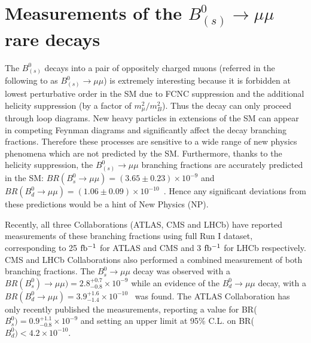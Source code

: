 %
%
%
%
%
%
%
%
%
\section{Measurements of the $B^0_{(s)} \to \mu\mu$ rare decays}
The $B^0_{(s)}$ decays into a pair of oppositely charged muons (referred in the following to as $B^0_{(s)} \to \mu\mu$) is extremely interesting because it is forbidden at lowest perturbative order in the SM due to FCNC suppression and the additional helicity suppression (by a factor of $m^2_{\mu}/m^2_B$). Thus the decay can only proceed through loop diagrams. New heavy particles in extensions of the SM can appear in competing Feynman diagrams and significantly affect the decay branching fractions. Therefore these processes are sensitive to a wide range of new physics phenomena which are not predicted by the SM. Furthermore, thanks to the helicity suppression, the $B^0_{(s)} \to \mu\mu$ branching fractions are accurately predicted in the SM: $BR(B^0_s \to \mu\mu) = (3.65 \pm 0.23) \times 10^{-9}$ and $BR(B^0_d \to \mu\mu) = (1.06 \pm 0.09) \times 10^{-10}$~\cite{Bobeth}. Hence any significant deviations from these predictions would be a hint of New Physics (NP).

Recently, all three Collaborations (ATLAS,  CMS and LHCb) have reported measurements of these branching fractions using full Run I dataset, corresponding to 25 $\rm{fb^{-1}}$ for ATLAS and CMS and 3 $\rm{fb^{-1}}$ for LHCb respectively. CMS and LHCb Collaborations also performed a combined measurement of both branching fractions. The $B^0_s \to \mu\mu$ decay was observed with a $BR(B^0_s) \to \mu\mu) = 2.8^{+0.7}_{-0.8} \times 10^{-9}$ while an evidence of the  $B^0_d \to \mu\mu$ decay, with a  $BR(B^0_d \to \mu\mu) = 3.9^{+1.6}_{-1.4} \times 10^{-10}$~\cite{Nature} was found.
The ATLAS Collaboration has only recently published the measurements, reporting a value for BR($B^0_s) = 0.9^{+1.1}_{-0.8}\times 10^{-9}$ and setting an upper limit at 95\% C.L. on  BR($B^0_d) < 4.2 \times 10^{-10}$.~\cite{ATLAS_Bmumu}

